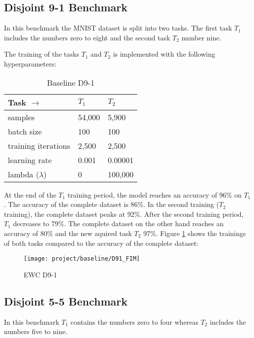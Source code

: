 \subsection{Disjoint 9-1 Benchmark}

In this benchmark the MNIST dataset is split into two tasks.
The first task $T_1$ includes the numbers zero to eight and the second task $T_2$ number nine.

The training of the tasks $T_1$ and $T_2$ is implemented with the following hyperparameters:

\begin{table}[H]
    \centering
    \begin{tabular}{ |l|l|l|  }
        \hline
        Task $\to$ & $T_1$ & $T_2$ \\
        \hline\hline
        samples & 54,000 & 5,900 \\
        \hline
        batch size & 100 & 100 \\
        \hline
        training iterations & 2,500 & 2,500 \\
        \hline
        learning rate & 0.001 & 0.00001 \\
        \hline
        lambda ($\lambda$) & 0 & 100,000 \\
        \hline
    \end{tabular}
    \caption{Baseline D9-1}
    \label{table:base_d91}
\end{table}

At the end of the $T_1$ training period, the model reaches an accuracy of 96\% on $T_1$.
The accuracy of the complete dataset is 86\%.
In the second training ($T_2$ training), the complete dataset peaks at 92\%.
After the second training period, $T_1$ decreases to 79\%.
The complete dataset on the other hand reaches an accuracy of 80\% and the new aquired task $T_2$ 97\%.
Figure \ref{fig:ewc_d9-1} shows the trainings of both tasks compared to the accuracy of the complete dataset:

\begin{figure}[H]
    \centering
    \texttt{[image: project/baseline/D91\_FIM]}
    \caption{EWC D9-1}
    \label{fig:ewc_d9-1}
\end{figure}

\subsection{Disjoint 5-5 Benchmark}

In this benchmark $T_1$ contains the numbers zero to four whereas $T_2$ includes the numbers five to nine.

